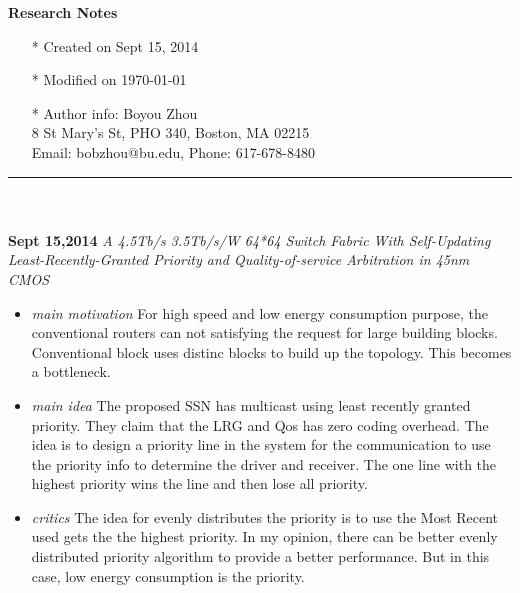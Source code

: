 \documentclass[]{article}
\begin{document}
\pagestyle{empty}
{\large\textbf{Research Notes}}
\begin{itemize}
    \item[*] Created on Sept 15, 2014
    \item[*] Modified on \today
    \item[*] Author info: Boyou Zhou\\
             8 St Mary's St, PHO 340, Boston, MA 02215\\
             Email: bobzhou@bu.edu, Phone: 617-678-8480
\end{itemize}

\rule[-0.1cm]{7.5in}{0.01cm}\\
\\
\noindent \textbf{Sept 15,2014}
\textit{A 4.5Tb/s 3.5Tb/s/W 64*64 Switch Fabric With Self-Updating Least-Recently-Granted Priority and Quality-of-service
        Arbitration in 45nm CMOS}
\indent		\begin{itemize}

            \item \textit{main motivation} For high speed and low energy consumption purpose, the conventional routers
            can not satisfying the request for large building blocks. Conventional block uses distinc blocks to build
            up the topology. This becomes a bottleneck.
            \item \textit{main idea} The proposed SSN has multicast using least recently granted priority. They claim 
            that the LRG and Qos has zero coding overhead. The idea is to design a priority line in the system for
            the communication to use the priority info to determine the driver and receiver. The one line with the 
            highest priority wins the line and then lose all priority.
            \item \textit{critics} The idea for evenly distributes the priority is to use the Most Recent used gets the
            the highest priority. In my opinion, there can be better evenly distributed priority algorithm to provide a
            better performance. But in this case, low energy consumption is the priority.
        \end{itemize}
\end{document}
